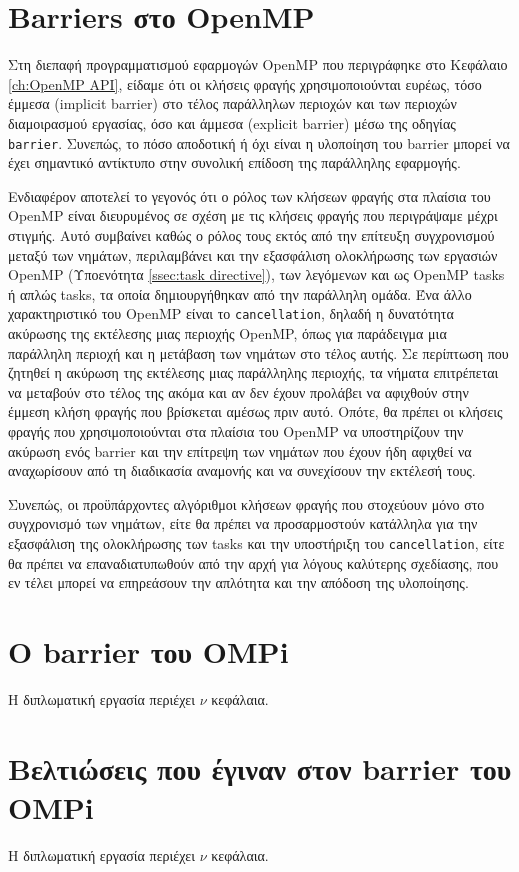 \section{Barriers στο OpenMP}
\label{sec:Barriers in OpenMP}
Στη διεπαφή προγραμματισμού εφαρμογών OpenMP που περιγράφηκε στο Κεφάλαιο \ref{ch:OpenMP API}, είδαμε ότι οι κλήσεις φραγής χρησιμοποιούνται ευρέως, τόσο έμμεσα (implicit barrier) στο τέλος παράλληλων περιοχών και των περιοχών διαμοιρασμού εργασίας, όσο και άμμεσα (explicit barrier) μέσω της οδηγίας \texttt{barrier}. Συνεπώς, το πόσο αποδοτική ή όχι είναι η υλοποίηση του barrier μπορεί να έχει σημαντικό αντίκτυπο στην συνολική επίδοση της παράλληλης εφαρμογής. %

Ενδιαφέρον αποτελεί το γεγονός ότι ο ρόλος των κλήσεων φραγής στα πλαίσια του OpenMP είναι διευρυμένος σε σχέση με τις κλήσεις φραγής που περιγράψαμε μέχρι στιγμής. Αυτό συμβαίνει καθώς ο ρόλος τους εκτός από την επίτευξη συγχρονισμού μεταξύ των νημάτων, περιλαμβάνει και την εξασφάλιση ολοκλήρωσης των εργασιών OpenMP (Υποενότητα \ref{ssec:task directive}), των λεγόμενων και ως OpenMP tasks ή απλώς tasks, τα οποία δημιουργήθηκαν από την παράλληλη ομάδα. Ένα άλλο χαρακτηριστικό του OpenMP είναι το \texttt{cancellation}, δηλαδή η δυνατότητα ακύρωσης της εκτέλεσης μιας περιοχής OpenMP, όπως για παράδειγμα μια παράλληλη περιοχή και η μετάβαση των νημάτων στο τέλος αυτής. Σε περίπτωση που ζητηθεί η ακύρωση της εκτέλεσης μιας παράλληλης περιοχής, τα νήματα επιτρέπεται να μεταβούν στο τέλος της ακόμα και αν δεν έχουν προλάβει να αφιχθούν στην έμμεση κλήση φραγής που βρίσκεται αμέσως πριν αυτό. Οπότε, θα πρέπει οι κλήσεις φραγής που χρησιμοποιούνται στα πλαίσια του OpenMP να υποστηρίζουν την ακύρωση ενός barrier και την επίτρεψη των νημάτων που έχουν ήδη αφιχθεί να αναχωρίσουν από τη διαδικασία αναμονής και να συνεχίσουν την εκτέλεσή τους.

Συνεπώς, οι προϋπάρχοντες αλγόριθμοι κλήσεων φραγής που στοχεύουν μόνο στο συγχρονισμό των νημάτων, είτε θα πρέπει να προσαρμοστούν κατάλληλα για την εξασφάλιση της ολοκλήρωσης των tasks και την υποστήριξη του \texttt{cancellation}, είτε θα πρέπει να επαναδιατυπωθούν από την αρχή για λόγους καλύτερης σχεδίασης, που εν τέλει μπορεί να επηρεάσουν την απλότητα και την απόδοση της υλοποίησης.

\section{Ο barrier του OMPi}
\label{sec:OMPi's barrier}
Η διπλωματική εργασία περιέχει $\nu$ κεφάλαια.

\section{Βελτιώσεις που έγιναν στον barrier του OMPi}
\label{sec:Improvements in OMPi's barrier}
Η διπλωματική εργασία περιέχει $\nu$ κεφάλαια.

